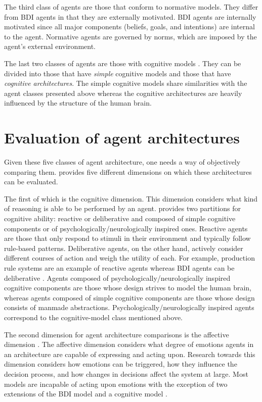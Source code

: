 The third class of agents are those that conform to normative models.
They differ from BDI agents in that they are externally motivated.
BDI agents are internally motivated since all major components (beliefs, goals, and intentions) are internal to the agent.
Normative agents are governed by norms, which are imposed by the agent's external environment.

The last two classes of agents are those with cognitive models \cite{balke_how_2014}.
They can be divided into those that have \textit{simple} cognitive models and those that have \textit{cognitive architectures}.
The simple cognitive models share similarities with the agent classes presented above
whereas the cognitive architectures are heavily influenced by the structure of the human brain.

\section{Evaluation of agent architectures}
\label{sec:agent_evaluation}

Given these five classes of agent architecture, one needs a way of objectively comparing them.
\cite{balke_how_2014} provides five different dimensions on which these architectures can be evaluated.

The first of which is the cognitive dimension.
This dimension considers what kind of reasoning is able to be performed by an agent.
\cite{balke_how_2014} provides two partitions for cognitive ability:
reactive or deliberative and composed of simple cognitive components or of psychologically/neurologically inspired ones.
Reactive agents are those that only respond to stimuli in their environment and typically follow rule-based patterns.
Deliberative agents, on the other hand, actively consider different courses of action and weigh the utility of each.
For example, production rule systems are an example of reactive agents whereas BDI agents can be deliberative \cite{balke_how_2014}.
Agents composed of psychologically/neurologically inspired cognitive components are those whose design strives to model the human brain,
whereas agents composed of simple cognitive components are those whose design consists of manmade abstractions.
Psychologically/neurologically inspired agents correspond to the cognitive-model class mentioned above.

The second dimension for agent architecture comparisons is the affective dimension \cite{balke_how_2014}.
The affective dimension considers what degree of emotions agents in an architecture are capable of expressing and acting upon.
Research towards this dimension considers how emotions can be triggered, how they influence the decision process, and how changes in decisions affect the system at large.
Most models are incapable of acting upon emotions \cite{balke_how_2014} with the exception of two extensions of the BDI model \cite{jiang_ebdi_2007, dignum_towards_2009} and a cognitive model \cite{urban_pecs_2000}.


